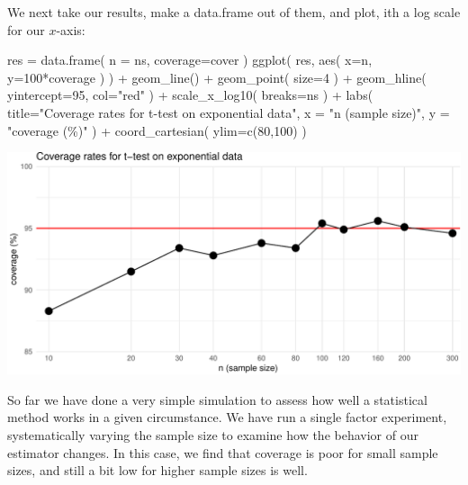 \documentclass[
]{book}
\newenvironment{Shaded}{\begin{snugshade}}{\end{snugshade}}
\newcommand{\AttributeTok}[1]{\textcolor[rgb]{0.77,0.63,0.00}{#1}}
\newcommand{\DecValTok}[1]{\textcolor[rgb]{0.00,0.00,0.81}{#1}}
\newcommand{\FunctionTok}[1]{\textcolor[rgb]{0.00,0.00,0.00}{#1}}
\newcommand{\NormalTok}[1]{#1}
\newcommand{\OtherTok}[1]{\textcolor[rgb]{0.56,0.35,0.01}{#1}}
\newcommand{\SpecialCharTok}[1]{\textcolor[rgb]{0.00,0.00,0.00}{#1}}
\newcommand{\StringTok}[1]{\textcolor[rgb]{0.31,0.60,0.02}{#1}}
\begin{document}
We next take our results, make a data.frame out of them, and plot, ith a log scale for our \(x\)-axis:

\begin{Shaded}
\begin{Highlighting}[]
\NormalTok{res }\OtherTok{=} \FunctionTok{data.frame}\NormalTok{( }\AttributeTok{n =}\NormalTok{ ns, }\AttributeTok{coverage=}\NormalTok{cover )}
\FunctionTok{ggplot}\NormalTok{( res, }\FunctionTok{aes}\NormalTok{( }\AttributeTok{x=}\NormalTok{n, }\AttributeTok{y=}\DecValTok{100}\SpecialCharTok{*}\NormalTok{coverage ) ) }\SpecialCharTok{+}
  \FunctionTok{geom\_line}\NormalTok{() }\SpecialCharTok{+} \FunctionTok{geom\_point}\NormalTok{( }\AttributeTok{size=}\DecValTok{4}\NormalTok{ ) }\SpecialCharTok{+}
  \FunctionTok{geom\_hline}\NormalTok{( }\AttributeTok{yintercept=}\DecValTok{95}\NormalTok{, }\AttributeTok{col=}\StringTok{"red"}\NormalTok{ ) }\SpecialCharTok{+}
  \FunctionTok{scale\_x\_log10}\NormalTok{( }\AttributeTok{breaks=}\NormalTok{ns ) }\SpecialCharTok{+}
  \FunctionTok{labs}\NormalTok{( }\AttributeTok{title=}\StringTok{"Coverage rates for t{-}test on exponential data"}\NormalTok{,}
        \AttributeTok{x =} \StringTok{"n (sample size)"}\NormalTok{, }\AttributeTok{y =} \StringTok{"coverage (\%)"}\NormalTok{ ) }\SpecialCharTok{+}
  \FunctionTok{coord\_cartesian}\NormalTok{( }\AttributeTok{ylim=}\FunctionTok{c}\NormalTok{(}\DecValTok{80}\NormalTok{,}\DecValTok{100}\NormalTok{) )}
\end{Highlighting}
\end{Shaded}

\begin{center}\includegraphics[width=0.75\linewidth]{Designing-Simulations-in-R_files/figure-latex/ttest_result_figure-1} \end{center}

So far we have done a very simple simulation to assess how well a statistical method works in a given circumstance.
We have run a single factor experiment, systematically varying the sample size to examine how the behavior of our estimator changes.
In this case, we find that coverage is poor for small sample sizes, and still a bit low for higher sample sizes is well.
\end{document}

